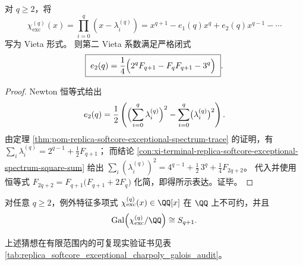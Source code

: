 \begin{proposition}\label{prop:pom-replica-softcore-exceptional-vieta-e2}
对 \(q\ge 2\)，将
\[
\chi_{\mathrm{exc}}^{(q)}(x)
=\prod_{i=0}^{q}(x-\lambda_i^{(q)})
=x^{q+1}-e_1(q)x^{q}+e_2(q)x^{q-1}-\cdots
\]
写为 Vieta 形式。
则第二 Vieta 系数满足严格闭式
\[
\boxed{\;
e_2(q)=\frac14\Bigl(2^{q}F_{q+1}-F_qF_{q+1}-3^{q}\Bigr)\; } .
\]
\end{proposition}
\begin{proof}
Newton 恒等式给出
\[
e_2(q)=\frac12\left(\Bigl(\sum_{i=0}^{q}\lambda_i^{(q)}\Bigr)^2-\sum_{i=0}^{q}\bigl(\lambda_i^{(q)}\bigr)^2\right).
\]
由定理 \ref{thm:pom-replica-softcore-exceptional-spectrum-trace} 的证明，有
\(
\sum_i\lambda_i^{(q)}=2^{q-1}+\frac12F_{q+1}
\)；
而结论 \ref{con:xi-terminal-replica-softcore-exceptional-spectrum-square-sum} 给出
\(
\sum_i(\lambda_i^{(q)})^2=4^{q-1}+\frac12\,3^q+\frac14F_{2q+2}
\)。
代入并使用恒等式 \(F_{2q+2}=F_{q+1}\bigl(F_{q+1}+2F_q\bigr)\) 化简，即得所示表达。证毕。
\end{proof}

\begin{conjecture}[例外特征多项式的不可约性与满对称伽罗瓦群]\label{conj:pom-replica-softcore-exceptional-charpoly-irreducible-symmetric-galois}
对任意 \(q\ge 2\)，例外特征多项式 \(\chi_{\mathrm{exc}}^{(q)}(x)\in\QQ[x]\) 在 \(\QQ\) 上不可约，并且
\[
\mathrm{Gal}\!\left(\chi_{\mathrm{exc}}^{(q)}/\QQ\right)\cong S_{q+1}.
\]
\end{conjecture}

上述猜想在有限范围内的可复现实验证书见表 \ref{tab:replica_softcore_exceptional_charpoly_galois_audit}。


